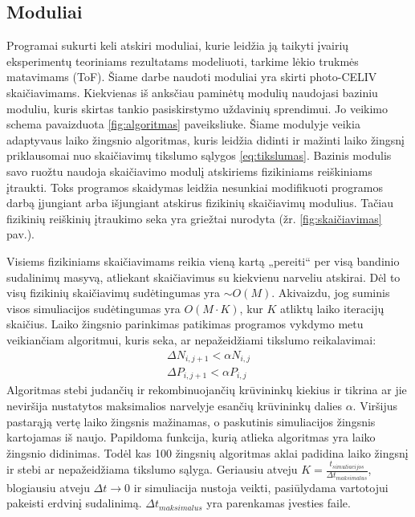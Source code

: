 \subsection{Moduliai}
Programai sukurti keli atskiri moduliai, kurie leidžia ją taikyti įvairių eksperimentų teoriniams rezultatams modeliuoti, tarkime lėkio trukmės matavimams (ToF). Šiame darbe naudoti moduliai yra skirti photo-CELIV skaičiavimams. Kiekvienas iš anksčiau paminėtų modulių naudojasi baziniu moduliu, kuris skirtas tankio pasiskirstymo uždavinių sprendimui. Jo veikimo schema pavaizduota  \ref{fig:algoritmas} paveiksliuke. Šiame modulyje veikia adaptyvaus laiko žingsnio algoritmas, kuris leidžia didinti ir mažinti laiko žingsnį priklausomai nuo skaičiavimų tikslumo sąlygos \eqref{eq:tikslumas}. Bazinis modulis savo ruožtu naudoja skaičiavimo modulį atskiriems fizikiniams reiškiniams įtraukti. Toks programos skaidymas leidžia nesunkiai modifikuoti programos darbą įjungiant arba išjungiant atskirus fizikinių skaičiavimų modulius. Tačiau fizikinių reiškinių įtraukimo seka yra griežtai nurodyta (žr.  \ref{fig:skaičiavimas} pav.).

Visiems fizikiniams skaičiavimams reikia vieną kartą „pereiti“ per visą bandinio sudalinimų masyvą, atliekant skaičiavimus su kiekvienu narveliu atskirai. Dėl to visų fizikinių skaičiavimų sudėtingumas yra \(\sim O(M)\). Akivaizdu, jog suminis visos simuliacijos sudėtingumas yra \(O(M \cdot K)\), kur \(K\) atliktų laiko iteracijų skaičius. Laiko žingsnio parinkimas patikimas programos vykdymo metu veikiančiam algoritmui, kuris seka, ar nepažeidžiami tikslumo reikalavimai:
\begin{equation} \label{eq:tikslumas}
\begin{array}{c}
\Delta N_{i,j+1} < \alpha N_{i,j} \\
\Delta P_{i,j+1} < \alpha P_{i,j}
\end{array}
\end{equation}
Algoritmas stebi judančių ir rekombinuojančių krūvininkų kiekius ir tikrina ar jie neviršija nustatytos maksimalios narvelyje esančių krūvininkų dalies \(\alpha\). Viršijus pastarąją vertę laiko žingsnis mažinamas, o paskutinis simuliacijos žingsnis kartojamas iš naujo. Papildoma funkcija, kurią atlieka algoritmas yra laiko žingsnio didinimas. Todėl kas 100 žingsnių algoritmas aklai padidina laiko žingsnį ir stebi ar nepažeidžiama tikslumo sąlyga.
Geriausiu atveju \(K= \frac{t_{simuliacijos}}{\Delta t_{maksimalus}}\), blogiausiu atveju \(\Delta t \rightarrow 0 \) ir simuliacija nustoja veikti, pasiūlydama vartotojui pakeisti erdvinį sudalinimą. \( \Delta t_{maksimalus} \) yra parenkamas įvesties faile.

